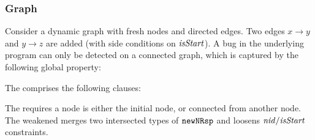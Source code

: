 \subsubsection*{Graph}
Consider a dynamic graph with fresh nodes and directed edges. Two edges \(x\!\to\!y\) and \(y\!\to\!z\) are added (with side conditions on \(\mathit{isStart}\)). A bug in the underlying program can only be detected on a connected graph, which is captured by the following global property:
\vspace{-.35cm}\par{}
\vspace{-.4cm}\par\nobreak\noindent
The \tyName{} comprises the following clauses:
\vspace{-.35cm}\par{}
\vspace{-.4cm}\par\nobreak\noindent
The \tyName{} requires a node is either the initial node, or connected from another node. The weakened \tyName{} merges two intersected types of \(\boldsymbol{{\tt newNRsp}}\) and loosens \(\mathit{nid}/\mathit{isStart}\) constraints.

